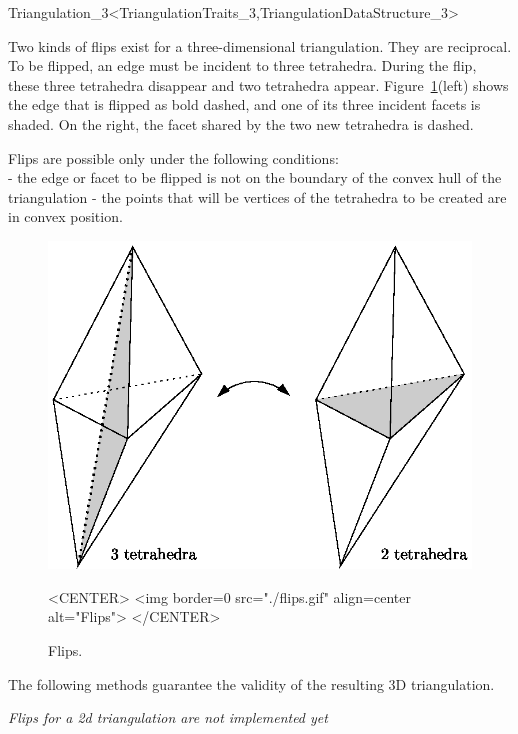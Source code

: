 \begin{ccRefClass}{Triangulation_3<TriangulationTraits_3,TriangulationDataStructure_3>}

Two kinds of flips exist for a three-dimensional triangulation. They
are reciprocal. To be flipped, an edge must be incident to three
tetrahedra. During the flip, these three tetrahedra disappear and two
tetrahedra appear. Figure~\ref{Triangulation3-fig-flips}(left) shows the
edge that is flipped as bold dashed, and one of its three incident
facets is shaded. On the right, the facet shared by the two new
tetrahedra is dashed. 

Flips are possible only under the following conditions:\\
- the edge or facet to be flipped is not on the boundary of the convex
hull of the triangulation 
- the points that will be vertices of the tetrahedra to be created are 
in convex position.

\begin{figure}
\begin{ccTexOnly}
\begin{center} 
\includegraphics{flips.eps}
\end{center}
\end{ccTexOnly}
\caption{Flips.
\label{Triangulation3-fig-flips}}
\begin{ccHtmlOnly}
<CENTER>
<img border=0 src="./flips.gif" align=center
alt="Flips">
</CENTER>
\end{ccHtmlOnly}
\end{figure} 

The following methods guarantee the validity of the resulting 3D
triangulation.

\textit{Flips for a 2d triangulation are not implemented yet}


\end{ccRefClass}
